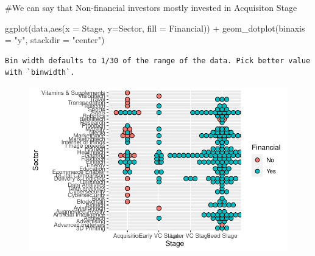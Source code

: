 \documentclass[
  letterpaper,
  DIV=11,
  numbers=noendperiod]{scrreprt}
\newenvironment{Shaded}{\begin{snugshade}}{\end{snugshade}}
\newcommand{\AttributeTok}[1]{\textcolor[rgb]{0.40,0.45,0.13}{#1}}
\newcommand{\FunctionTok}[1]{\textcolor[rgb]{0.28,0.35,0.67}{#1}}
\newcommand{\NormalTok}[1]{\textcolor[rgb]{0.00,0.23,0.31}{#1}}
\newcommand{\SpecialCharTok}[1]{\textcolor[rgb]{0.37,0.37,0.37}{#1}}
\newcommand{\StringTok}[1]{\textcolor[rgb]{0.13,0.47,0.30}{#1}}
\begin{document}
\#We can say that Non-financial investors mostly invested in Acquisiton
Stage

\begin{Shaded}
\begin{Highlighting}[]
  \FunctionTok{ggplot}\NormalTok{(data,}\FunctionTok{aes}\NormalTok{(}\AttributeTok{x =}\NormalTok{ Stage, }\AttributeTok{y=}\NormalTok{Sector, }\AttributeTok{fill =}\NormalTok{ Financial)) }\SpecialCharTok{+}
    \FunctionTok{geom\_dotplot}\NormalTok{(}\AttributeTok{binaxis =} \StringTok{"y"}\NormalTok{, }\AttributeTok{stackdir =} \StringTok{"center"}\NormalTok{)}
\end{Highlighting}
\end{Shaded}

\begin{verbatim}
Bin width defaults to 1/30 of the range of the data. Pick better value with `binwidth`.
\end{verbatim}

\begin{figure}[H]

{\centering \includegraphics{./assignment1_files/figure-pdf/unnamed-chunk-13-1.pdf}

}

\end{figure}
\end{document}
